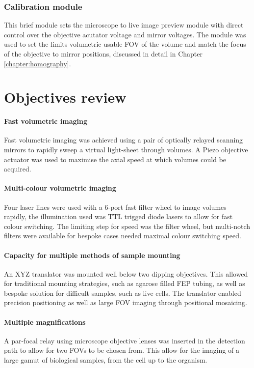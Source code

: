\subsubsection{Calibration module}

This brief module sets the microscope to live image preview module with direct control over the objective acutator voltage and mirror voltages.
The module was used to set the limits volumetric usable FOV of the volume and match the focus of the objective to mirror positions, discussed in detail in Chapter \ref{chapter:homography}.

\section{Objectives review}

\paragraph{Fast volumetric imaging}
Fast volumetric imaging was achieved using a pair of optically relayed scanning mirrors to rapidly sweep a virtual light-sheet through volumes.
A Piezo objective actuator was used to maximise the axial speed at which volumes could be acquired.

\paragraph{Multi-colour volumetric imaging}
Four laser lines were used with a 6-port fast filter wheel to image volumes rapidly, the illumination used was TTL trigged diode lasers to allow for fast colour switching.
The limiting step for speed was the filter wheel, but multi-notch filters were available for bespoke cases needed maximal colour switching speed.%

\paragraph{Capacity for multiple methods of sample mounting}
An XYZ translator was mounted well below two dipping objectives.
This allowed for traditional mounting strategies, such as agarose filled FEP tubing, as well as bespoke solution for difficult samples, such as live cells.
The translator enabled precision positioning as well as large FOV imaging through positional mosaicing.

\paragraph{Multiple magnifications}
A par-focal relay using microscope objective lenses was inserted in the detection path to allow for two FOVs to be chosen from. This allow for the imaging of a large gamut of biological samples, from the cell up to the organism.


